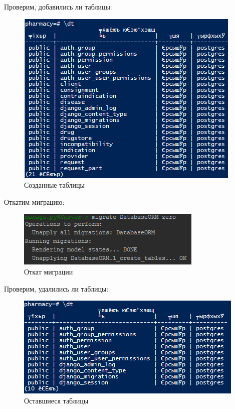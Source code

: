 \documentclass[14pt,a4paper,report]{report}
\begin{document}
\clearpage

Проверим, добавились ли таблицы:

\begin{figure}[h!]
	\centering
	\includegraphics[scale = 0.85]{images/4.png}
	\caption{Созданные таблицы}
	\label{image:4}
\end{figure}

Откатим миграцию:

\begin{figure}[h!]
	\centering
	\includegraphics[scale = 0.95]{images/5.png}
	\caption{Откат миграции}
	\label{image:5}
\end{figure}

Проверим, удалились ли таблицы:

\begin{figure}[h!]
	\centering
	\includegraphics[scale = 0.85]{images/6.png}
	\caption{Оставшиеся таблицы}
	\label{image:6}
\end{figure}
\end{document}
